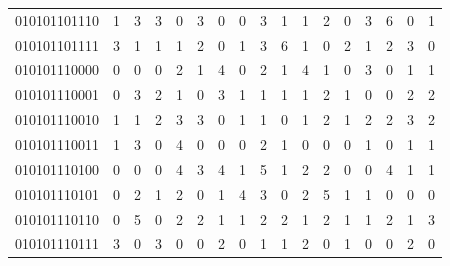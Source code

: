 \documentclass[10pt,a4paper]{article}
\begin{document}
\begin{longtable}{ |c|c|c|c|c|c|c|c|c|c|c|c|c|c|c|c|c| }
    010101101110              & 1                            & 3                                & 3                            & 0                              & 3   & 0   & 0   & 3   & 1   & 1   & 2   & 0   & 3   & 6   & 0   & 1   \\
    010101101111              & 3                            & 1                                & 1                            & 1                              & 2   & 0   & 1   & 3   & 6   & 1   & 0   & 2   & 1   & 2   & 3   & 0   \\
    010101110000              & 0                            & 0                                & 0                            & 2                              & 1   & 4   & 0   & 2   & 1   & 4   & 1   & 0   & 3   & 0   & 1   & 1   \\
    010101110001              & 0                            & 3                                & 2                            & 1                              & 0   & 3   & 1   & 1   & 1   & 1   & 2   & 1   & 0   & 0   & 2   & 2   \\
    010101110010              & 1                            & 1                                & 2                            & 3                              & 3   & 0   & 1   & 1   & 0   & 1   & 2   & 1   & 2   & 2   & 3   & 2   \\
    010101110011              & 1                            & 3                                & 0                            & 4                              & 0   & 0   & 0   & 2   & 1   & 0   & 0   & 0   & 1   & 0   & 1   & 1   \\
    010101110100              & 0                            & 0                                & 0                            & 4                              & 3   & 4   & 1   & 5   & 1   & 2   & 2   & 0   & 0   & 4   & 1   & 1   \\
    010101110101              & 0                            & 2                                & 1                            & 2                              & 0   & 1   & 4   & 3   & 0   & 2   & 5   & 1   & 1   & 0   & 0   & 0   \\
    010101110110              & 0                            & 5                                & 0                            & 2                              & 2   & 1   & 1   & 2   & 2   & 1   & 2   & 1   & 1   & 2   & 1   & 3   \\
    010101110111              & 3                            & 0                                & 3                            & 0                              & 0   & 2   & 0   & 1   & 1   & 2   & 0   & 1   & 0   & 0   & 2   & 0   \\

\end{longtable}
\end{document}

